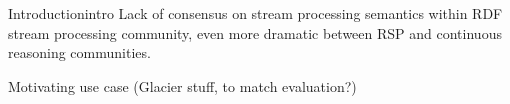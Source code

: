 \begin{nestedsection}{Introduction}{intro}
	Lack of consensus on stream processing semantics within RDF stream processing community, even more dramatic between RSP and continuous reasoning communities.

	Motivating use case (Glacier stuff, to match evaluation?)
\end{nestedsection}
